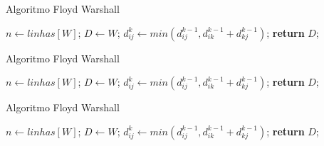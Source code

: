 \documentclass{beamer}
\begin{document}
	\begin{frame}{Algoritmo Floyd Warshall}
		\begin{algorithm}[H]
			\caption{Floyd-Warshall}\label{alg:fw}
			\begin{algorithmic}[1]
				\State $n \gets linhas[W]$;
				\State $D\gets W$;
				          
				          
				\State $d^k_{ij} \gets min(d^{k-1}_{ij}, d^{k-1}_{ik} + d^{k-1}_{kj})$; 
				\EndFor
				\EndFor
				\EndFor
				\State \textbf{return} $D$;
				\EndProcedure
			\end{algorithmic}
		\end{algorithm}
	\end{frame}
	
	\begin{frame}{Algoritmo Floyd Warshall}
		\begin{algorithm}[H]
			\caption{Floyd-Warshall}\label{alg:fw}
			\begin{algorithmic}[1]
				\State $n \gets linhas[W]$;
				\State $D\gets W$;
				          
				          
				          
				\State $d^k_{ij} \gets min(d^{k-1}_{ij}, d^{k-1}_{ik} + d^{k-1}_{kj})$; 
				\EndFor
				\EndFor
				\EndFor
				\State \textbf{return} $D$;
				\EndProcedure
			\end{algorithmic}
		\end{algorithm}
	\end{frame}
	
	\begin{frame}{Algoritmo Floyd Warshall}
		\begin{algorithm}[H]
			\caption{Floyd-Warshall}\label{alg:fw}
			\begin{algorithmic}[1]
				\State $n \gets linhas[W]$;
				\State $D\gets W$;
				          
				          
				          
				\State $d^k_{ij} \gets min(d^{k-1}_{ij}, d^{k-1}_{ik} + d^{k-1}_{kj})$;  
				\EndFor
				\EndFor
				\EndFor
				\State \textbf{return} $D$;
				\EndProcedure
			\end{algorithmic}
		\end{algorithm}
	\end{frame}
\end{document}
